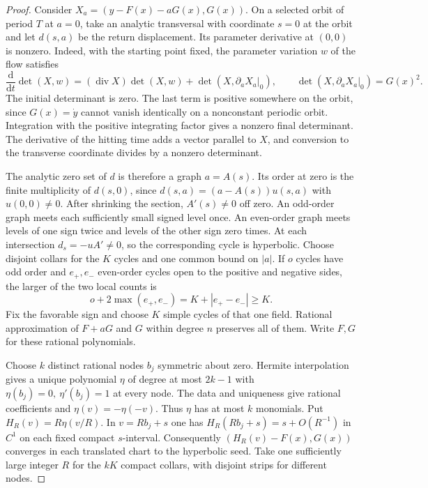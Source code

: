 \begin{proof}
Consider \(X_a=(y-F(x)-aG(x),G(x))\). On a selected orbit of period \(T\) at \(a=0\), take an analytic transversal with coordinate \(s=0\) at the orbit and let \(d(s,a)\) be the return displacement. Its parameter derivative at \((0,0)\) is nonzero. Indeed, with the starting point fixed, the parameter variation \(w\) of the flow satisfies
\[
 \frac{\mathrm d}{\mathrm dt}\det(X,w)
   =(\operatorname{div}X)\det(X,w)+\det(X,\partial_aX_a|_0),
 \qquad \det(X,\partial_aX_a|_0)=G(x)^2 .
\]
The initial determinant is zero. The last term is positive somewhere on the orbit, since \(G(x)=\dot y\) cannot vanish identically on a nonconstant periodic orbit. Integration with the positive integrating factor gives a nonzero final determinant. The derivative of the hitting time adds a vector parallel to \(X\), and conversion to the transverse coordinate divides by a nonzero determinant.

The analytic zero set of \(d\) is therefore a graph \(a=A(s)\). Its order at zero is the finite multiplicity of \(d(s,0)\), since \(d(s,a)=(a-A(s))u(s,a)\) with \(u(0,0)\ne0\). After shrinking the section, \(A'(s)\ne0\) off zero. An odd-order graph meets each sufficiently small signed level once. An even-order graph meets levels of one sign twice and levels of the other sign zero times. At each intersection \(d_s=-uA'\ne0\), so the corresponding cycle is hyperbolic. Choose disjoint collars for the \(K\) cycles and one common bound on \(|a|\). If \(o\) cycles have odd order and \(e_+,e_-\) even-order cycles open to the positive and negative sides, the larger of the two local counts is
\[
 o+2\max(e_+,e_-)=K+|e_+-e_-|\ge K .
\]
Fix the favorable sign and choose \(K\) simple cycles of that one field. Rational approximation of \(F+aG\) and \(G\) within degree \(n\) preserves all of them. Write \(F,G\) for these rational polynomials.

Choose \(k\) distinct rational nodes \(b_j\) symmetric about zero. Hermite interpolation gives a unique polynomial \(\eta\) of degree at most \(2k-1\) with \(\eta(b_j)=0,\ \eta'(b_j)=1\) at every node. The data and uniqueness give rational coefficients and \(\eta(v)=-\eta(-v)\). Thus \(\eta\) has at most \(k\) monomials. Put \(H_R(v)=R\eta(v/R)\). In \(v=Rb_j+s\) one has \(H_R(Rb_j+s)=s+O(R^{-1})\) in \(C^1\) on each fixed compact \(s\)-interval. Consequently \((H_R(v)-F(x),G(x))\) converges in each translated chart to the hyperbolic seed. Take one sufficiently large integer \(R\) for the \(kK\) compact collars, with disjoint strips for different nodes.


\end{proof}
